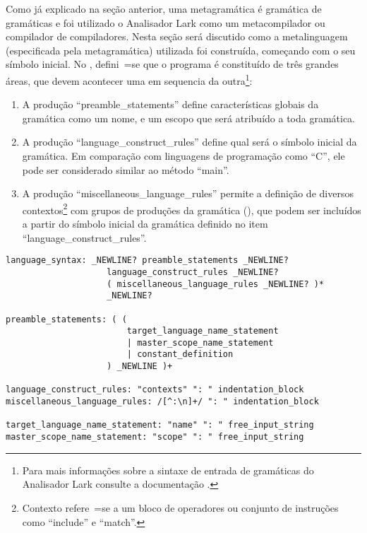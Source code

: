 Como já explicado na seção anterior,
uma metagramática é gramática de gramáticas e
foi utilizado o Analisador Lark \cite{larkContextualLexer} como um metacompilador ou
compilador de compiladores.
Nesta seção será discutido como a metalinguagem (especificada pela metagramática) utilizada foi construída,
começando com o seu símbolo inicial.
No ,
defini~=se que o programa é constituído de três grandes áreas,
que devem acontecer uma em sequencia da outra\footnote{
Para mais informações sobre a sintaxe de entrada de gramáticas do Analisador Lark consulte a documentação \cite{larkGrammarReference,larkStyleCheat}.
}:
\begin{enumerate}
\item A produção ``preamble\_statements'' define características globais da gramática como um nome,
e um escopo que será atribuído a toda gramática.
\item A produção ``language\_construct\_rules'' define qual será o símbolo inicial da gramática.
Em comparação com linguagens de programação como ``C'',
ele pode ser considerado similar ao método ``main''.
\item A produção ``miscellaneous\_language\_rules'' permite a definição de diversos contextos\footnote{
Contexto refere~=se a um bloco de operadores ou
conjunto de instruções como ``include'' e
``match''.
} com grupos de produções da gramática (),
que podem ser incluídos a partir do símbolo inicial da gramática definido no item ``language\_construct\_rules''.
\end{enumerate}%
\begin{lstlisting}[caption={Simbolo Inicial da Metagramática ``ObjectBeauty''},label={simboloInicialDaMetagramatica},style=yaml_style]
language_syntax: _NEWLINE? preamble_statements _NEWLINE?
                    language_construct_rules _NEWLINE?
                    ( miscellaneous_language_rules _NEWLINE? )*
                    _NEWLINE?

preamble_statements: ( (
                        target_language_name_statement
                        | master_scope_name_statement
                        | constant_definition
                    ) _NEWLINE )+

language_construct_rules: "contexts" ": " indentation_block
miscellaneous_language_rules: /[^:\n]+/ ": " indentation_block

target_language_name_statement: "name" ": " free_input_string
master_scope_name_statement: "scope" ": " free_input_string
\end{lstlisting}

